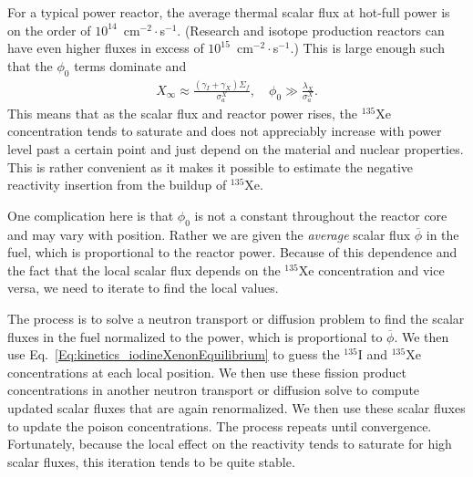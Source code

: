 For a typical power reactor, the average thermal scalar flux at hot-full power is on the order of $10^{14}$~cm$^{-2}\cdot$s$^{-1}$. (Research and isotope production reactors can have even higher fluxes in excess of $10^{15}$~cm$^{-2}\cdot$s$^{-1}$.) This is large enough such that the $\phi_0$ terms dominate and
\begin{align}
  X_\infty \approx \frac{ ( \gamma_I + \gamma_X ) \Sigma_f  }{ \sigma_a^X } , \quad   \phi_0 \gg \frac{\lambda_X}{\sigma_a^X} . 
\end{align}
This means that as the scalar flux and reactor power rises, the $^{135}$Xe concentration tends to saturate and does not appreciably increase with power level past a certain point and just depend on the material and nuclear properties. This is rather convenient as it makes it possible to estimate the negative reactivity insertion from the buildup of $^{135}$Xe.

One complication here is that $\phi_0$ is not a constant throughout the reactor core and may vary with position. Rather we are given the \emph{average} scalar flux $\overline{\phi}$ in the fuel, which is proportional to the reactor power. Because of this dependence and the fact that the local scalar flux depends on the $^{135}$Xe concentration and vice versa, we need to iterate to find the local values. 

The process is to solve a neutron transport or diffusion problem to find the scalar fluxes in the fuel normalized to the power, which is proportional to $\overline{\phi}$. We then use Eq.~\eqref{Eq:kinetics_iodineXenonEquilibrium} to guess the $^{135}$I and $^{135}$Xe concentrations at each local position. We then use these fission product concentrations in another neutron transport or diffusion solve to compute updated scalar fluxes that are again renormalized. We then use these scalar fluxes to update the poison concentrations. The process repeats until convergence. Fortunately, because the local effect on the reactivity tends to saturate for high scalar fluxes, this iteration tends to be quite stable.

